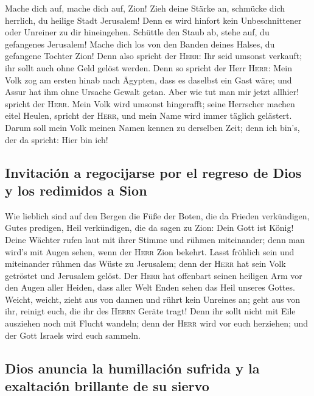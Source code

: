  Mache dich auf, mache dich auf, Zion! Zieh deine Stärke
an, schmücke dich herrlich, du heilige Stadt Jerusalem! Denn es wird
hinfort kein Unbeschnittener oder Unreiner zu dir hineingehen.
 Schüttle den Staub ab, stehe auf, du gefangenes
Jerusalem! Mache dich los von den Banden deines Halses, du gefangene
Tochter Zion!  Denn also spricht der \textsc{Herr}: Ihr
seid umsonst verkauft; ihr sollt auch ohne Geld gelöst werden.
 Denn so spricht der Herr \textsc{Herr}: Mein Volk zog am
ersten hinab nach Ägypten, dass es daselbst ein Gast wäre; und Assur hat
ihm ohne Ursache Gewalt getan.  Aber wie tut man mir jetzt
allhier! spricht der \textsc{Herr}. Mein Volk wird umsonst hingerafft;
seine Herrscher machen eitel Heulen, spricht der \textsc{Herr}, und mein
Name wird immer täglich gelästert.  Darum soll mein Volk
meinen Namen kennen zu derselben Zeit; denn ich bin's, der da spricht:
Hier bin ich!

\hypertarget{invitaciuxf3n-a-regocijarse-por-el-regreso-de-dios-y-los-redimidos-a-sion}{%
\subsection{Invitación a regocijarse por el regreso de Dios y los
redimidos a
Sion}\label{invitaciuxf3n-a-regocijarse-por-el-regreso-de-dios-y-los-redimidos-a-sion}}

 Wie lieblich sind auf den Bergen die Füße der Boten, die
da Frieden verkündigen, Gutes predigen, Heil verkündigen, die da sagen
zu Zion: Dein Gott ist König!  Deine Wächter rufen laut
mit ihrer Stimme und rühmen miteinander; denn man wird's mit Augen
sehen, wenn der \textsc{Herr} Zion bekehrt.  Lasst
fröhlich sein und miteinander rühmen das Wüste zu Jerusalem; denn der
\textsc{Herr} hat sein Volk getröstet und Jerusalem gelöst.
 Der \textsc{Herr} hat offenbart seinen heiligen Arm vor
den Augen aller Heiden, dass aller Welt Enden sehen das Heil unseres
Gottes.  Weicht, weicht, zieht aus von dannen und rührt
kein Unreines an; geht aus von ihr, reinigt euch, die ihr des
\textsc{Herrn} Geräte tragt!  Denn ihr sollt nicht mit
Eile ausziehen noch mit Flucht wandeln; denn der \textsc{Herr} wird vor
euch herziehen; und der Gott Israels wird euch sammeln.

\hypertarget{dios-anuncia-la-humillaciuxf3n-sufrida-y-la-exaltaciuxf3n-brillante-de-su-siervo}{%
\subsection{Dios anuncia la humillación sufrida y la exaltación
brillante de su
siervo}\label{dios-anuncia-la-humillaciuxf3n-sufrida-y-la-exaltaciuxf3n-brillante-de-su-siervo}}

